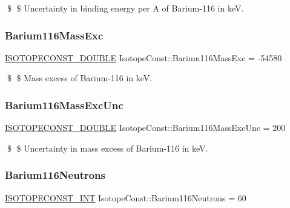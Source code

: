 \$ \$ Uncertainty in binding energy per A of Barium-\/116 in keV. \mbox{\label{group___isotope_const-_barium-_ba116_gaeaeb80d7c0fa4b34e500ce26e0e1adad}} 
\subsubsection{\texorpdfstring{Barium116\+Mass\+Exc}{Barium116MassExc}}
{\footnotesize\ttfamily \mbox{\hyperlink{group___isotope_const-_macros_ga8f45a7272ce02c0b4c65c44636ed719a}{I\+S\+O\+T\+O\+P\+E\+C\+O\+N\+S\+T\+\_\+\+D\+O\+U\+B\+LE}} Isotope\+Const\+::\+Barium116\+Mass\+Exc = -\/54580}

\$ \$ Mass excess of Barium-\/116 in keV. \mbox{\label{group___isotope_const-_barium-_ba116_ga5e21e1a6ced6a5356d65ce6f7a7ed823}} 
\subsubsection{\texorpdfstring{Barium116\+Mass\+Exc\+Unc}{Barium116MassExcUnc}}
{\footnotesize\ttfamily \mbox{\hyperlink{group___isotope_const-_macros_ga8f45a7272ce02c0b4c65c44636ed719a}{I\+S\+O\+T\+O\+P\+E\+C\+O\+N\+S\+T\+\_\+\+D\+O\+U\+B\+LE}} Isotope\+Const\+::\+Barium116\+Mass\+Exc\+Unc = 200}

\$ \$ Uncertainty in mass excess of Barium-\/116 in keV. \mbox{\label{group___isotope_const-_barium-_ba116_ga09876f7c9d6902c336ef3e952ef934fb}} 
\subsubsection{\texorpdfstring{Barium116\+Neutrons}{Barium116Neutrons}}
{\footnotesize\ttfamily \mbox{\hyperlink{group___isotope_const-_macros_ga5f18360b3e99483a35c32d789e62621c}{I\+S\+O\+T\+O\+P\+E\+C\+O\+N\+S\+T\+\_\+\+I\+NT}} Isotope\+Const\+::\+Barium116\+Neutrons = 60}

